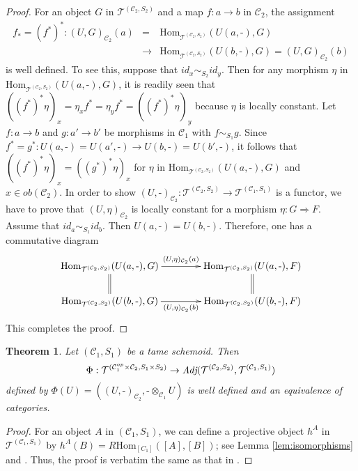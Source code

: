 \documentclass{amsart}
\newtheorem{thm}{Theorem}[section]
\theoremstyle{definition}
\theoremstyle{remark}
\newcommand{\K}{R}%
\newcommand{\C}{{\mathcal C}}
\newcommand{\T}{{\mathcal T}}
\newcounter{eqn}[section]
\begin{document}
\begin{proof}
For an object $G$ in $\T^{(\C_2, S_2)}$ and a map $f : a \to b$ in $\C_2$, the assignment 
\begin{eqnarray*}
f_*= (f^*)^* : (U, G)_{\C_2}(a) \!\!\!\!\!&=&\!\!\!\!\!\text{Hom}_{\T^{(\C_2, S_2)}}(U(a, \text{-}), G)\\
  &\longrightarrow& \text{Hom}_{\T^{(\C_2, S_2)}}(U(b, \text{-}), G)=(U, G)_{\C_2}(b)
\end{eqnarray*}
is well defined. To see this, suppose that $id_x\sim_{S_2} id_y$. 
Then for any morphism $\eta$ in $\text{Hom}_{\T^{(\C_2, S_2)}}(U(a, \text{-}), G)$, it is readily seen that 
$((f^*)^*\eta)_x = \eta_x f^* = \eta_y f^* =((f^*)^*\eta)_y$ because $\eta$ is locally constant. 
Let $f : a\to b$ and $g : a' \to b'$ be morphisms in $\C_1$ with $f\sim_{S_1} g$. Since 
$f^* = g^* : U(a, \text{-}) = U(a', \text{-})\to U(b, \text{-}) = U(b', \text{-})$, it follows that 
$((f^*)^*\eta)_x = ((g^*)^*\eta)_x$
for 
$\eta$ in $\text{Hom}_{\T^{(\C_2, S_2)}}(U(a, \text{-}), G)$ and $x \in ob(\C_2)$. In order to show 
$(U, \text{-})_{\C_2} : \T^{(\C_2, S_2)} \to \T^{(\C_1, S_1)}$ is a functor, we have to prove that $(U, \eta)_{\C_2}$ is locally constant 
for a morphism $\eta : G \Rightarrow F$. Assume that $id_a \sim_{S_1}id_b$. Then $U(a, \text{-}) = U(b, \text{-})$. 
Therefore,  one has a commutative diagram  
$$
\xymatrix@C40pt@R20pt{
\text{Hom}_{\T^{(\C_2, S_2)}}(U(a, \text{-}), G) \ar[r]^-{(U, \eta)_{\C_2}(a)}\ar@{=}[d]& 
\text{Hom}_{\T^{(\C_2, S_2)}}(U(a, \text{-}), F) \ar@{=}[d]\\
\text{Hom}_{\T^{(\C_2, S_2)}}(U(b, \text{-}), G) \ar[r]_-{(U, \eta)_{\C_2}(b)} &
\text{Hom}_{\T^{(\C_2, S_2)}}(U(b, \text{-}), F) 
}
$$
This completes the proof. 
\end{proof}

\begin{thm}\label{thm:Adj} Let $(\C_1, S_1)$ be a tame schemoid. Then  
$$
\Phi :\T^{(\C_1^{op}\times \C_2, S_1 \times S_2)} \to \text{\em Adj}(\T^{(\C_2, S_2)}, \T^{(\C_1, S_1)})
$$
defined by $\Phi(U) = ((U, \text{-})_{\C_2}, \text{-} \otimes_{\C_1}U)$ is well defined and an equivalence of categories.  
\end{thm}

\begin{proof} For an object $A$ in $(\C_1, S_1)$, we can define a projective object $h^A$ in $\T^{(\C_1, S_1)}$ 
by $h^A(B) = \K\text{Hom}_{[C_1]}([A],[B])$; see Lemma \ref{lem:isomorphisms} and \cite{Mitchell81}. 
Thus, the proof is verbatim the same as that in \cite[Corollary 2.2]{P-N}.
\end{proof}
\end{document}
